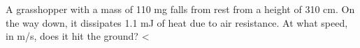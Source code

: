         A grasshopper with a mass of 110 mg falls from rest
        from a height of 310 cm.  On the way down, it dissipates 1.1
        mJ of heat due to air resistance.  At what speed, in m/s,
        does it hit the ground?
        <%
